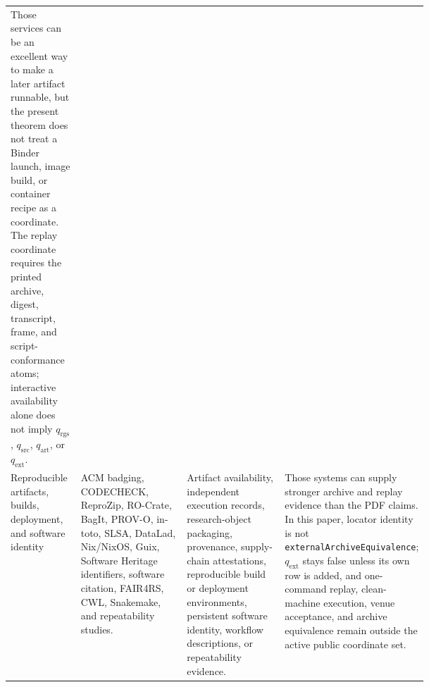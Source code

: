 \documentclass[runningheads]{llncs}
\newcommand{\qrgs}{q_{\mathrm{rgs}}}
\newcommand{\qsrc}{q_{\mathrm{src}}}
\newcommand{\qart}{q_{\mathrm{art}}}
\newcommand{\qext}{q_{\mathrm{ext}}}
\begin{document}
\begin{table}
\begin{tabularx}{\linewidth}{@{}L{0.17\linewidth}L{0.27\linewidth}L{0.25\linewidth}Y@{}}
Those services can be an excellent way to make a later artifact runnable, but the
present theorem does not treat a Binder launch, image build, or container recipe
as a coordinate.  The replay coordinate requires the printed archive, digest,
transcript, frame, and script-conformance atoms; interactive availability alone
does not imply \(\qrgs\), \(\qsrc\), \(\qart\), or \(\qext\). \\
\addlinespace
Reproducible artifacts, builds, deployment, and software identity &
ACM badging, CODECHECK, ReproZip, RO-Crate, BagIt, PROV-O, in-toto, SLSA,
DataLad, Nix/NixOS, Guix, Software Heritage identifiers, software citation,
FAIR4RS, CWL, Snakemake, and repeatability studies. &
Artifact availability, independent execution records, research-object packaging,
provenance, supply-chain attestations, reproducible build or deployment
environments, persistent software identity, workflow descriptions, or
repeatability evidence. &
Those systems can supply stronger archive and replay evidence than the PDF
claims.  In this paper, locator identity is not
\texttt{externalArchiveEquivalence}; \(\qext\) stays false unless its own row is
added, and one-command replay, clean-machine execution, venue acceptance, and
archive equivalence remain outside the active public coordinate set. \\
\bottomrule
\end{tabularx}
\end{table}
\end{document}
